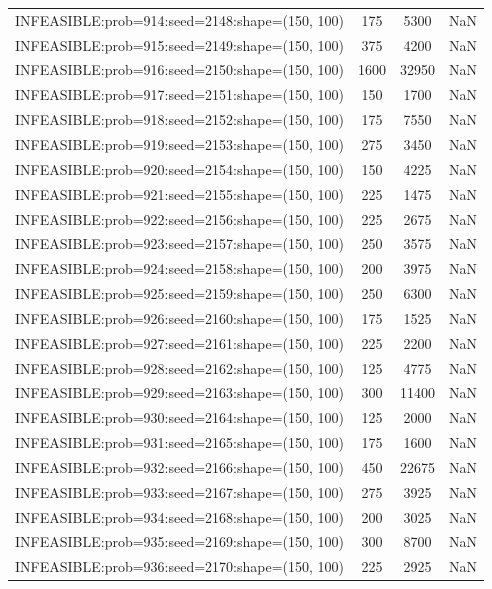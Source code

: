 \begin{longtable}{lccc}
INFEASIBLE:prob=914:seed=2148:shape=(150, 100) &      175 &  5300 &    NaN \\
INFEASIBLE:prob=915:seed=2149:shape=(150, 100) &      375 &  4200 &    NaN \\
INFEASIBLE:prob=916:seed=2150:shape=(150, 100) &     1600 & 32950 &    NaN \\
INFEASIBLE:prob=917:seed=2151:shape=(150, 100) &      150 &  1700 &    NaN \\
INFEASIBLE:prob=918:seed=2152:shape=(150, 100) &      175 &  7550 &    NaN \\
INFEASIBLE:prob=919:seed=2153:shape=(150, 100) &      275 &  3450 &    NaN \\
INFEASIBLE:prob=920:seed=2154:shape=(150, 100) &      150 &  4225 &    NaN \\
INFEASIBLE:prob=921:seed=2155:shape=(150, 100) &      225 &  1475 &    NaN \\
INFEASIBLE:prob=922:seed=2156:shape=(150, 100) &      225 &  2675 &    NaN \\
INFEASIBLE:prob=923:seed=2157:shape=(150, 100) &      250 &  3575 &    NaN \\
INFEASIBLE:prob=924:seed=2158:shape=(150, 100) &      200 &  3975 &    NaN \\
INFEASIBLE:prob=925:seed=2159:shape=(150, 100) &      250 &  6300 &    NaN \\
INFEASIBLE:prob=926:seed=2160:shape=(150, 100) &      175 &  1525 &    NaN \\
INFEASIBLE:prob=927:seed=2161:shape=(150, 100) &      225 &  2200 &    NaN \\
INFEASIBLE:prob=928:seed=2162:shape=(150, 100) &      125 &  4775 &    NaN \\
INFEASIBLE:prob=929:seed=2163:shape=(150, 100) &      300 & 11400 &    NaN \\
INFEASIBLE:prob=930:seed=2164:shape=(150, 100) &      125 &  2000 &    NaN \\
INFEASIBLE:prob=931:seed=2165:shape=(150, 100) &      175 &  1600 &    NaN \\
INFEASIBLE:prob=932:seed=2166:shape=(150, 100) &      450 & 22675 &    NaN \\
INFEASIBLE:prob=933:seed=2167:shape=(150, 100) &      275 &  3925 &    NaN \\
INFEASIBLE:prob=934:seed=2168:shape=(150, 100) &      200 &  3025 &    NaN \\
INFEASIBLE:prob=935:seed=2169:shape=(150, 100) &      300 &  8700 &    NaN \\
INFEASIBLE:prob=936:seed=2170:shape=(150, 100) &      225 &  2925 &    NaN \\

\end{longtable}
